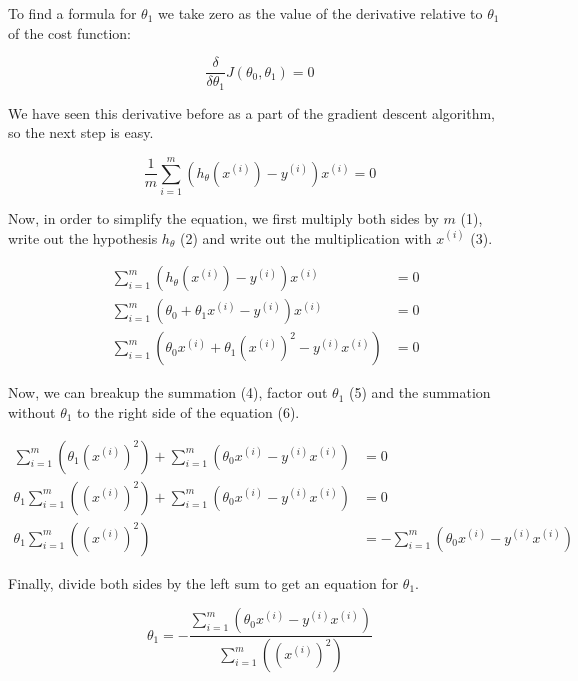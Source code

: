 \documentclass[12pt, a4paper]{article}
\begin{document}
To find a formula for $\theta_1$ we take zero as the value of the derivative relative to $\theta_1$ of the cost function: 

\begin{equation*}
\frac{\delta}{\delta\theta_1}J(\theta_0, \theta_1) = 0
\end{equation*}

We have seen this derivative before as a part of the gradient descent algorithm, so the next step is easy. 

\begin{equation*}
 \frac{1}{m} \sum\limits_{i=1}^m (h _{\theta} (x ^{(i)}) - y ^{(i)})x^{(i)} = 0
\end{equation*}

Now, in order to simplify the equation, we first multiply both sides by $m$ (1), write out the hypothesis $h_\theta$ (2) and write out the multiplication with $x^{(i)}$ (3).

\begin{align}
&\sum\limits_{i=1}^m(h_\theta(x^{(i)})-y^{(i)})x^{(i)} &= 0\\
&\sum\limits_{i=1}^m(\theta_0+\theta_1x^{(i)} - y^{(i)})x^{(i)} &= 0\\
&\sum\limits_{i=1}^m(\theta_0x^{(i)} + \theta_1(x^{(i)})^2 - y^{(i)}x^{(i)}) &= 0
\end{align}

Now, we can breakup the summation (4), factor out $\theta_1$ (5) and the summation without $\theta_1$ to the right side of the equation (6).

\begin{align}
\sum\limits_{i=1}^m(\theta_1(x^{(i)})^2 ) + \sum\limits_{i=1}^m(\theta_0x^{(i)} - y^{(i)}x^{(i)}) &= 0\\
\theta_1\sum\limits_{i=1}^m((x^{(i)})^2 ) + \sum\limits_{i=1}^m(\theta_0x^{(i)} - y^{(i)}x^{(i)}) &= 0\\
\theta_1\sum\limits_{i=1}^m((x^{(i)})^2 )   &= - \sum\limits_{i=1}^m(\theta_0x^{(i)} - y^{(i)}x^{(i)})
\end{align}

Finally, divide both sides by the left sum to get an equation for $\theta_1$.

\begin{equation*}
\theta_1 = -\frac{\sum\limits_{i=1}^m(\theta_0x^{(i)} - y^{(i)}x^{(i)})}{\sum\limits_{i=1}^m((x^{(i)})^2 )}
\end{equation*}
\end{document}
